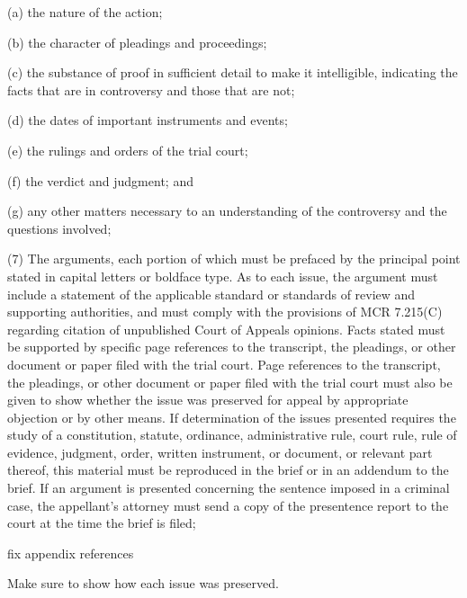\documentclass[12pt,\documentclassflag]{michiganCourtOfAppealsBrief}
\begin{document}
\begin{todolist}
      \item (a) the nature of the action;

      \item (b) the character of pleadings and proceedings;

      \item (c) the substance of proof in sufficient detail to make it intelligible, indicating the facts that are in controversy and those that are not;

      \item (d) the dates of important instruments and events;

      \item (e) the rulings and orders of the trial court;

      \item (f) the verdict and judgment; and

      \item (g) any other matters necessary to an understanding of the controversy and the questions involved;

      \item (7) The arguments, each portion of which must be prefaced by the principal point stated in capital letters or boldface type. As to each issue, the argument must include a statement of the applicable standard or standards of review and supporting authorities, and must comply with the provisions of MCR 7.215(C) regarding citation of unpublished Court of Appeals opinions. Facts stated must be supported by specific page references to the transcript, the pleadings, or other document or paper filed with the trial court. Page references to the transcript, the pleadings, or other document or paper filed with the trial court must also be given to show whether the issue was preserved for appeal by appropriate objection or by other means. If determination of the issues presented requires the study of a constitution, statute, ordinance, administrative rule, court rule, rule of evidence, judgment, order, written instrument, or document, or relevant part thereof, this material must be reproduced in the brief or in an addendum to the brief. If an argument is presented concerning the sentence imposed in a criminal case, the appellant's attorney must send a copy of the presentence report to the court at the time the brief is filed;

        \item fix appendix references
        \item Make sure to show how each issue was preserved.
\end{todolist}
\end{document}

